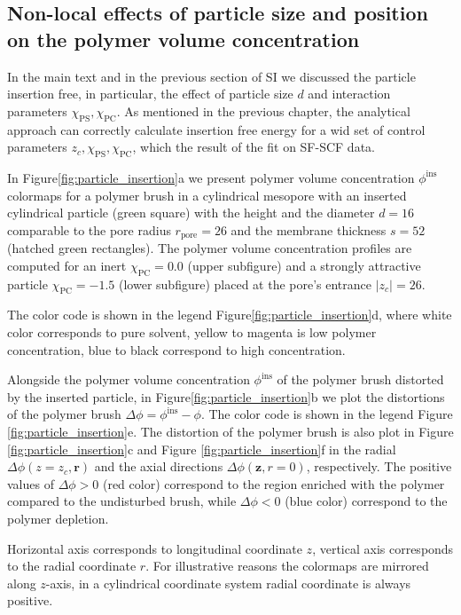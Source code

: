 \documentclass[10pt, a4paper]{article}
\begin{document}
\subsection*{Non-local effects of particle size and position on the polymer volume concentration}
\begin{multicols}{2}
In the main text and in the previous section of SI we discussed the particle insertion free, in particular, the effect of particle size $d$ and interaction parameters $\chi_{\textrm{PS}}, \chi_{\textrm{PC}}$.
As mentioned in the previous chapter, the analytical approach can correctly calculate insertion free energy for a wid set of control parameters $z_c, \chi_{\textrm{PS}}, \chi_{\textrm{PC}}$, which the result of the fit on SF-SCF data.

In Figure\ref{fig:particle_insertion}a we present polymer volume concentration $\phi^{\textrm{ins}}$ colormaps for a polymer brush in a cylindrical mesopore with an inserted cylindrical particle (green square) with the height and the diameter $d=16$ comparable to the pore radius $r_{\textrm{pore}}=26$ and the membrane thickness $s=52$ (hatched green rectangles).
The polymer volume concentration profiles are computed for an inert $\chi_{\textrm{PC}} = 0.0$ (upper subfigure) and a strongly attractive particle $\chi_{\textrm{PC}} = -1.5$ (lower subfigure) placed at the pore's entrance $|z_c| = 26$.

The color code is shown in the legend Figure\ref{fig:particle_insertion}d, where white color corresponds to pure solvent, yellow to magenta is low polymer concentration, blue to black correspond to high concentration.

Alongside the polymer volume concentration $\phi^{\textrm{ins}}$ of the polymer brush distorted by the inserted particle, in Figure\ref{fig:particle_insertion}b we plot the distortions of the polymer brush $\Delta \phi = \phi^{\textrm{ins}} - \phi$.
The color code is shown in the legend Figure \ref{fig:particle_insertion}e.
The distortion of the polymer brush is also plot in Figure \ref{fig:particle_insertion}c and Figure \ref{fig:particle_insertion}f in the radial $\Delta \phi(z=z_c, \bm{r})$ and the axial directions $\Delta \phi(\bm{z}, r=0)$, 
respectively.
The positive values of $\Delta \phi > 0$ (red color) correspond to the region enriched with the polymer compared to the undisturbed brush, while $\Delta \phi < 0$ (blue color) correspond to the polymer depletion.

Horizontal axis corresponds to longitudinal coordinate $z$, vertical axis corresponds to the radial coordinate $r$.
For illustrative reasons the colormaps are mirrored along $z$-axis, in a cylindrical coordinate system radial coordinate is always positive.


\end{multicols}
\end{document}
